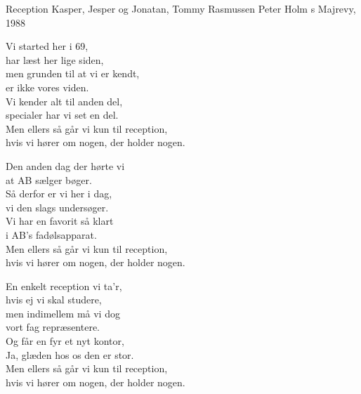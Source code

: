 \begin{song}{Reception}
  {} %
  {Kasper, Jesper og Jonatan, Tommy Rasmussen} %
  {Peter Holm} %
  {\TKET{}s Majrevy, 1988} %
  {\NotCCLIed} %

  \begin{SBVerse}
    Vi started her i 69,\\
    har læst her lige siden,\\
    men grunden til at vi er kendt,\\
    er ikke vores viden.\\
    \medskip
    Vi kender alt til anden del,\\
    specialer har vi set en del.\\
    \medskip
    Men ellers så går vi kun til reception,\\
    hvis vi hører om nogen, der holder nogen.
  \end{SBVerse}

  \begin{SBVerse}
    Den anden dag der hørte vi\\
    at AB sælger bøger.\\
    Så derfor er vi her i dag,\\
    vi den slags undersøger.\\
    \medskip
    Vi har en favorit så klart\\
    i AB’s fadølsapparat.\\
    \medskip
    Men ellers så går vi kun til reception,\\
    hvis vi hører om nogen, der holder nogen.
  \end{SBVerse}

  \begin{SBVerse}
    En enkelt reception vi ta’r,\\
    hvis ej vi skal studere,\\
    men indimellem må vi dog\\
    vort fag repræsentere.\\
    \medskip
    Og får en fyr et nyt kontor,\\
    Ja, glæden hos os den er stor.\\
    \medskip
    Men ellers så går vi kun til reception,\\
    hvis vi hører om nogen, der holder nogen.
  \end{SBVerse}


\end{song}
